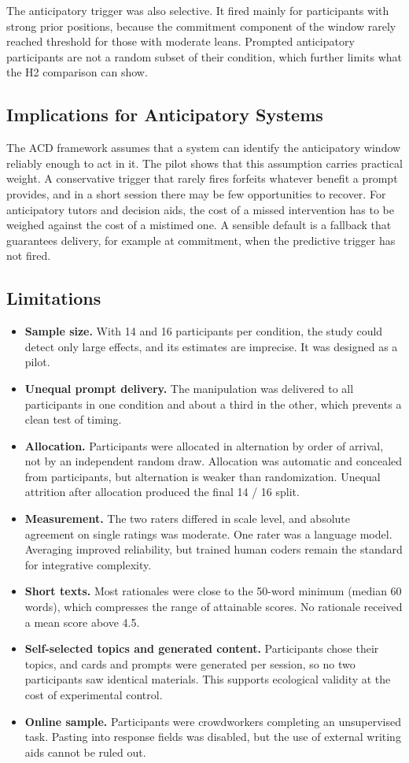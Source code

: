 \documentclass[12pt,letterpaper]{article}
\begin{document}
The anticipatory trigger was also selective. It fired mainly for participants with strong prior positions, because the commitment component of the window rarely reached threshold for those with moderate leans. Prompted anticipatory participants are not a random subset of their condition, which further limits what the H2 comparison can show.

\subsection{Implications for Anticipatory Systems}
The ACD framework assumes that a system can identify the anticipatory window reliably enough to act in it. The pilot shows that this assumption carries practical weight. A conservative trigger that rarely fires forfeits whatever benefit a prompt provides, and in a short session there may be few opportunities to recover. For anticipatory tutors and decision aids, the cost of a missed intervention has to be weighed against the cost of a mistimed one. A sensible default is a fallback that guarantees delivery, for example at commitment, when the predictive trigger has not fired.

\subsection{Limitations}
\begin{itemize}
\item \textbf{Sample size.} With 14 and 16 participants per condition, the study could detect only large effects, and its estimates are imprecise. It was designed as a pilot.
\item \textbf{Unequal prompt delivery.} The manipulation was delivered to all participants in one condition and about a third in the other, which prevents a clean test of timing.
\item \textbf{Allocation.} Participants were allocated in alternation by order of arrival, not by an independent random draw. Allocation was automatic and concealed from participants, but alternation is weaker than randomization. Unequal attrition after allocation produced the final 14 / 16 split.
\item \textbf{Measurement.} The two raters differed in scale level, and absolute agreement on single ratings was moderate. One rater was a language model. Averaging improved reliability, but trained human coders remain the standard for integrative complexity.
\item \textbf{Short texts.} Most rationales were close to the 50-word minimum (median 60 words), which compresses the range of attainable scores. No rationale received a mean score above 4.5.
\item \textbf{Self-selected topics and generated content.} Participants chose their topics, and cards and prompts were generated per session, so no two participants saw identical materials. This supports ecological validity at the cost of experimental control.
\item \textbf{Online sample.} Participants were crowdworkers completing an unsupervised task. Pasting into response fields was disabled, but the use of external writing aids cannot be ruled out.
\end{itemize}
\end{document}
